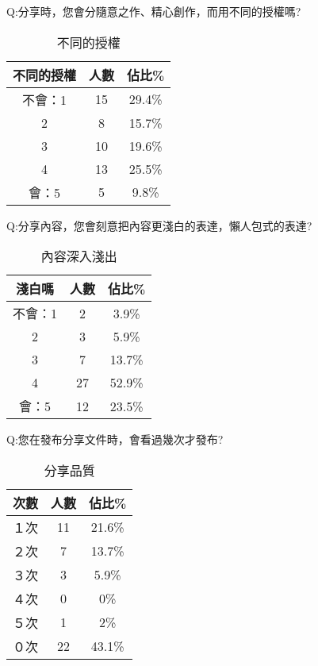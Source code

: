 Q:分享時，您會分隨意之作、精心創作，而用不同的授權嗎?


\begin{center} 
\begin{table}[h]
\centering
\caption{不同的授權}
\label{4_1_bias}
\begin{tabular}{ccc} \hline
不同的授權&	人數 &	佔比\% \\ \hline
不會：1	&15	&29.4\% \\ \hline
2	&8&	15.7\% \\ \hline
3	&10	&19.6\% \\ \hline
4	&13	&25.5\% \\ \hline
會：5&	5&	9.8\% \\ \hline
\end{tabular}
\end{table}
\end{center}


Q:分享內容，您會刻意把內容更淺白的表達，懶人包式的表達?

\begin{center} 
\begin{table}[h]
\centering
\caption{內容深入淺出}
\label{4_1_content_clear}
\begin{tabular}{ccc} \hline
淺白嗎&	人數 &	佔比\% \\ \hline
不會：1&	2&	3.9\% \\ \hline
2	&3	&5.9\% \\ \hline
3	&7	&13.7\% \\ \hline
4	&27	&52.9\% \\ \hline
會：5&	12&	23.5\% \\ \hline
\end{tabular}
\end{table}
\end{center}




Q:您在發布分享文件時，會看過幾次才發布?


\begin{center} 
\begin{table}[h]
\centering
\caption{分享品質}
\label{4_1_times}
\begin{tabular}{ccc} \hline
次數&	人數 &	佔比\% \\ \hline
１次&	11&	21.6\% \\ \hline
２次&	7&	13.7\% \\ \hline
３次&	3&	5.9\% \\ \hline
４次&	0&	0\% \\ \hline
５次&	1&	2\% \\ \hline
０次&	22&	43.1\% \\ \hline
\end{tabular}
\end{table}
\end{center}




